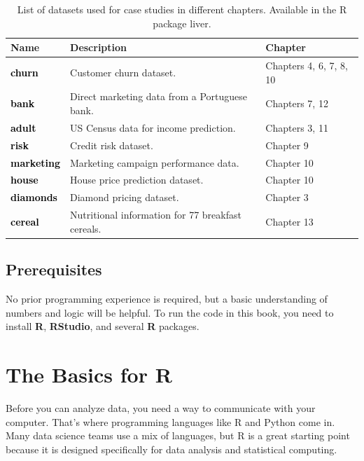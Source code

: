 \documentclass[
]{book}
\theoremstyle{definition}
\theoremstyle{definition}
\theoremstyle{definition}
\theoremstyle{definition}
\theoremstyle{remark}
\begin{document}
\begin{table}
\centering
\caption{\label{tab:data-table}List of datasets used for case studies in different chapters. Available in the R package liver.}
\centering
\begin{tabular}[t]{>{}l>{\raggedright\arraybackslash}p{20em}l}
\toprule
Name & Description & Chapter\\
\midrule
\textcolor{black}{\textbf{churn}} & Customer churn dataset. & Chapters 4, 6, 7, 8, 10\\
\textcolor{black}{\textbf{bank}} & Direct marketing data from a Portuguese bank. & Chapters 7, 12\\
\textcolor{black}{\textbf{adult}} & US Census data for income prediction. & Chapters 3, 11\\
\textcolor{black}{\textbf{risk}} & Credit risk dataset. & Chapter 9\\
\textcolor{black}{\textbf{marketing}} & Marketing campaign performance data. & Chapter 10\\
\addlinespace
\textcolor{black}{\textbf{house}} & House price prediction dataset. & Chapter 10\\
\textcolor{black}{\textbf{diamonds}} & Diamond pricing dataset. & Chapter 3\\
\textcolor{black}{\textbf{cereal}} & Nutritional information for 77 breakfast cereals. & Chapter 13\\
\bottomrule
\end{tabular}
\end{table}

\section*{Prerequisites}\label{prerequisites}

No prior programming experience is required, but a basic understanding of numbers and logic will be helpful. To run the code in this book, you need to install \textbf{R}, \textbf{RStudio}, and several \textbf{R} packages.

\chapter{The Basics for R}\label{chapter-into-R}

Before you can analyze data, you need a way to communicate with your computer. That's where programming languages like R and Python come in. Many data science teams use a mix of languages, but R is a great starting point because it is designed specifically for data analysis and statistical computing.
\end{document}
